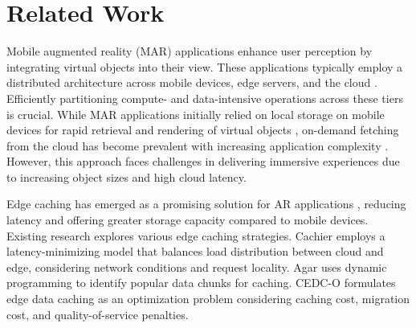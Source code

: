 \section{Related Work}
\label{sec:related}
    Mobile augmented reality (MAR) applications \cite{bib:arsurvey1} enhance user perception by integrating virtual objects into their view. These applications typically employ a distributed architecture across mobile devices, edge servers, and the cloud \cite{bib:edgearch, bib:arena, bib:iotarch}.  Efficiently partitioning compute- and data-intensive operations across these tiers is crucial. While MAR applications initially relied on local storage on mobile devices for rapid retrieval and rendering of virtual objects \cite{bib:localcache}, on-demand fetching from the cloud has become prevalent with increasing application complexity \cite{bib:cloudar1, bib:cloudar2, bib:cloudar3, bib:cloudar4}. However, this approach faces challenges in delivering immersive experiences due to increasing object sizes and high cloud latency.

    Edge caching has emerged as a promising solution for AR applications \cite{bib:cachemec, bib:artactile}, reducing latency and offering greater storage capacity compared to mobile devices.  Existing research explores various edge caching strategies. Cachier \cite{bib:cachier} employs a latency-minimizing model that balances load distribution between cloud and edge, considering network conditions and request locality. Agar \cite{bib:agar} uses dynamic programming to identify popular data chunks for caching. CEDC-O \cite{bib:onlinecoll} formulates edge data caching as an optimization problem considering caching cost, migration cost, and quality-of-service penalties.
    
